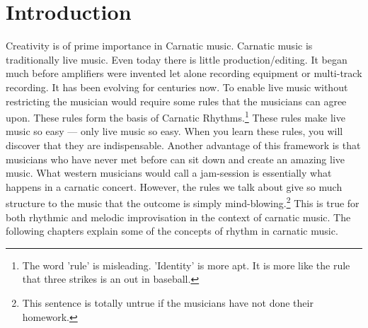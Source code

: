 \chapter{Introduction}

Creativity is of prime importance in Carnatic music. Carnatic music is
traditionally live music. Even today there is little production/editing. It began
much before amplifiers were invented let alone recording equipment or multi-track
recording. It has been evolving for centuries now. To enable live music without
restricting the musician would require some rules that the musicians can agree upon.
These rules form the basis of Carnatic Rhythms.\footnote{The word 'rule' is
misleading. 'Identity' is more apt. It is more like the rule that three strikes is
an out in baseball.} These rules make live music so easy --- only live music so
easy. When you learn these rules, you will discover that they are indispensable.
Another advantage of this framework is that musicians who have never met before can
sit down and create an amazing live music. What western musicians would call a
jam-session is essentially what happens in a carnatic concert. However, the rules we
talk about give so much structure to the music that the outcome is simply
mind-blowing.\footnote{This sentence is totally untrue if the musicians have not done
their homework.} This is true for both rhythmic and melodic improvisation in the
context of carnatic music. The following chapters explain some of the concepts of
rhythm in carnatic music.
